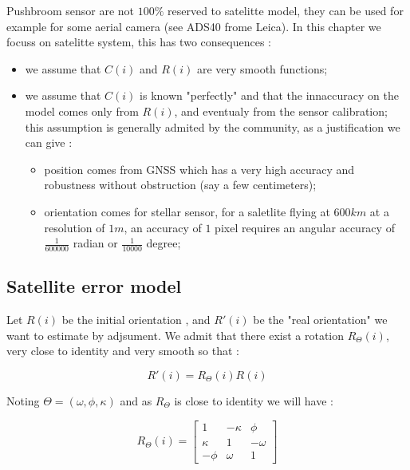 Pushbroom sensor are not $100\%$ reserved to satelitte model, they can be used for example for some
aerial camera (see ADS40 frome Leica).
In this chapter we  focuss on satelitte system, this has two consequences :

\begin{itemize}
    \item we assume that $C(i)$  and $R(i)$  are very smooth functions;
    \item we assume that $C(i)$  is known  "perfectly" and that the innaccuracy
          on the model comes only from $R(i)$, and eventualy from the sensor calibration;  this assumption is generally admited
          by the community, as a justification we can give :
    \begin{itemize}
         \item  position comes from GNSS which has a very high accuracy and robustness without obstruction (say a few centimeters);
         \item  orientation comes for stellar sensor, for a saletlite flying at $600km$ at a resolution of $1m$,
                an accuracy of $1$ pixel requires an angular accuracy of $\frac{1}{600000}$ radian or $\frac{1}{10000}$ degree;
     \end{itemize}
\end{itemize}


\subsection{Satellite error model}

Let $R(i)$ be the initial orientation , and $R'(i)$ be the "real orientation"
we want to estimate by adjsument.
We admit that there exist a rotation $R_\Theta(i)$, very close to identity and
very smooth so that :

\begin{equation}
    R'(i) = R_\Theta(i) R(i)
\end{equation}

Noting $\Theta=(\omega,\phi,\kappa)$ and as  $R_\Theta$ is close to identity we will have :

%
%
%

\begin{equation}
    R_\Theta(i) = 
\begin{bmatrix}
1 &  - \kappa & \phi\\
\kappa & 1 & -\omega\\
-\phi & \omega & 1
\end{bmatrix} 	
\end{equation}


